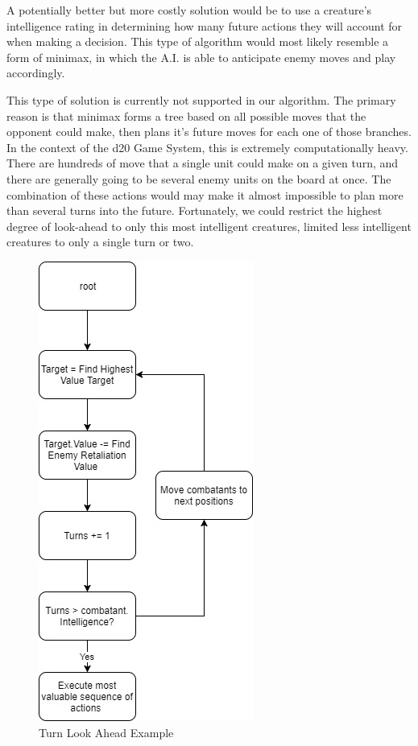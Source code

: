 \documentclass[12pt,a4paper]{report}
\begin{document}
		A potentially better but more costly solution would be to use a creature's intelligence rating in determining how many future actions they will account for when making a decision. This type of algorithm would most likely resemble a form of minimax, in which the A.I. is able to anticipate enemy moves and play accordingly. 
		
		This type of solution is currently not supported in our algorithm. The primary reason is that minimax forms a tree based on all possible moves that the opponent could make, then plans it's future moves for each one of those branches. In the context of the d20 Game System, this is extremely computationally heavy. There are hundreds of move that a single unit could make on a given turn, and there are generally going to be several enemy units on the board at once. The combination of these actions would may make it almost impossible to plan more than several turns into the future. Fortunately, we could restrict the highest degree of look-ahead to only this most intelligent creatures, limited less intelligent creatures to only a single turn or two. 
		
		\begin{figure}[H]
			\centering
			\includegraphics[scale=.8]{TurnLookAhead}
			\caption{Turn Look Ahead Example}
			\label{fig: Turn Look Ahead}
		\end{figure}
		
\end{document}
